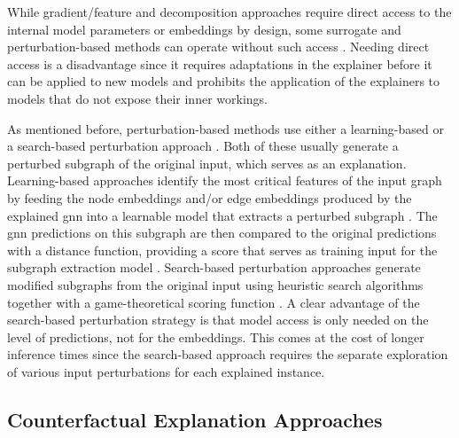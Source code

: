 While gradient/feature and decomposition approaches require direct access to the internal model parameters or embeddings by design, some surrogate and perturbation-based methods can operate without such access \cite{kakkad_survey_2023}. Needing direct access is a disadvantage since it requires adaptations in the explainer before it can be applied to new models and prohibits the application of the explainers to models that do not expose their inner workings.

As mentioned before, perturbation-based methods use either a learning-based or a search-based perturbation approach \cite{xia_explaining_2023}. Both of these usually generate a perturbed subgraph of the original input, which serves as an explanation. Learning-based approaches identify the most critical features of the input graph by feeding the node embeddings and/or edge embeddings produced by the explained \gls{gnn} into a learnable model that extracts a perturbed subgraph \cite{kakkad_survey_2023, xia_explaining_2023}. The \gls{gnn} predictions on this subgraph are then compared to the original predictions with a distance function, providing a score that serves as training input for the subgraph extraction model \cite{kakkad_survey_2023}. Search-based perturbation approaches generate modified subgraphs from the original input using heuristic search algorithms together with a game-theoretical scoring function \cite{xia_explaining_2023, yuan_explainability_2021}. A clear advantage of the search-based perturbation strategy is that model access is only needed on the level of predictions, not for the embeddings. This comes at the cost of longer inference times \cite{xia_explaining_2023} since the search-based approach requires the separate exploration of various input perturbations for each explained instance.



\subsection{Counterfactual Explanation Approaches}
\label{s_ExplainingGNNs_CounterFactual}

